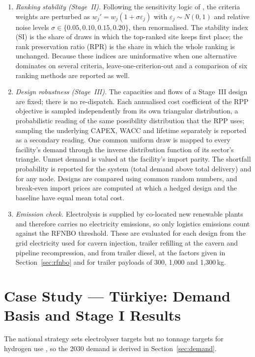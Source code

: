 \documentclass[preprint,12pt,authoryear]{elsarticle}
\begin{document}
\begin{enumerate}
    \item \textit{Ranking stability (Stage~II).} Following the sensitivity logic of \citet{triantaphyllou1997sensitivity}, the criteria weights are perturbed as $w_j' = w_j(1 + \sigma\varepsilon_j)$ with $\varepsilon_j \sim N(0,1)$ and relative noise levels $\sigma \in \{0.05, 0.10, 0.15, 0.20\}$, then renormalised. The stability index (SI) is the share of draws in which the top-ranked site keeps first place; the rank preservation ratio (RPR) is the share in which the whole ranking is unchanged. Because these indices are uninformative when one alternative dominates on several criteria, leave-one-criterion-out and a comparison of six ranking methods are reported as well.
    \item \textit{Design robustness (Stage~III).} The capacities and flows of a Stage~III design are fixed; there is no re-dispatch. Each annualised cost coefficient of the RPP objective is sampled independently from its own triangular distribution, a probabilistic reading of the same possibility distribution that the RPP uses; sampling the underlying CAPEX, WACC and lifetime separately is reported as a secondary reading. One common uniform draw is mapped to every facility's demand through the inverse distribution function of its sector's triangle. Unmet demand is valued at the facility's import parity. The shortfall probability is reported for the system (total demand above total delivery) and for any node. Designs are compared using common random numbers, and break-even import prices are computed at which a hedged design and the baseline have equal mean total cost.
    \item \textit{Emission check.} Electrolysis is supplied by co-located new renewable plants and therefore carries no electricity emissions, so only logistics emissions count against the RFNBO threshold. These are evaluated for each design from the grid electricity used for cavern injection, trailer refilling at the cavern and pipeline recompression, and from trailer diesel, at the factors given in Section~\ref{sec:rfnbo} and for trailer payloads of 300, 1,000 and 1,300\,kg.
\end{enumerate}

\section{Case Study --- Türkiye: Demand Basis and Stage I Results}

The national strategy sets electrolyser targets but no tonnage targets for hydrogen use \citep{menr2023hydrogen}, so the 2030 demand is derived in Section~\ref{sec:demand}.
\end{document}
